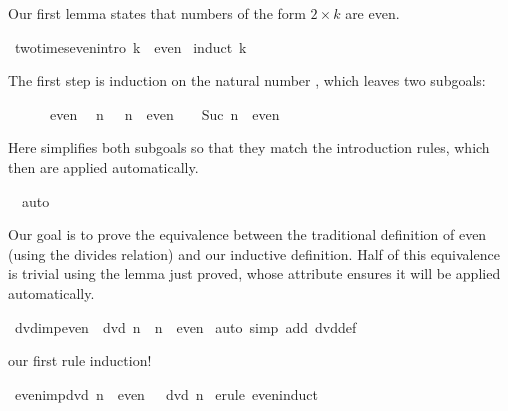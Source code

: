 \begin{isabellebody}
\begin{isamarkuptext}
Our first lemma states that numbers of the form $2\times k$ are even.%
\end{isamarkuptext}%
\ two{\isacharunderscore}times{\isacharunderscore}even{\isacharbrackleft}intro{\isacharbang}{\isacharbrackright}{\isacharcolon}\ {\isachardoublequote}{\isacharhash}{}{\isacharasterisk}k\ {\isasymin}\ even{\isachardoublequote}\isanewline
{}\ {\isacharparenleft}induct\ {\isachardoublequote}k{\isachardoublequote}{\isacharparenright}%
\begin{isamarkuptxt}%
The first step is induction on the natural number , which leaves
two subgoals:
\begin{isabelle}%
\ {}{\isachardot}\ {\isacharhash}{}\ {\isacharasterisk}\ {}\ {\isasymin}\ even\isanewline
\ {}{\isachardot}\ {\isasymAnd}n{\isachardot}\ {\isacharhash}{}\ {\isacharasterisk}\ n\ {\isasymin}\ even\ {\isasymLongrightarrow}\ {\isacharhash}{}\ {\isacharasterisk}\ Suc\ n\ {\isasymin}\ even%
\end{isabelle}
Here  simplifies both subgoals so that they match the introduction
rules, which then are applied automatically.%
\end{isamarkuptxt}%
\ \ auto\isanewline
{}%
\begin{isamarkuptext}%
Our goal is to prove the equivalence between the traditional definition
of even (using the divides relation) and our inductive definition.  Half of
this equivalence is trivial using the lemma just proved, whose 
attribute ensures it will be applied automatically.%
\end{isamarkuptext}%
\ dvd{\isacharunderscore}imp{\isacharunderscore}even{\isacharcolon}\ {\isachardoublequote}{\isacharhash}{}\ dvd\ n\ {\isasymLongrightarrow}\ n\ {\isasymin}\ even{\isachardoublequote}\isanewline
{}\ {\isacharparenleft}auto\ simp\ add{\isacharcolon}\ dvd{\isacharunderscore}def{\isacharparenright}%
\begin{isamarkuptext}%
our first rule induction!%
\end{isamarkuptext}%
\ even{\isacharunderscore}imp{\isacharunderscore}dvd{\isacharcolon}\ {\isachardoublequote}n\ {\isasymin}\ even\ {\isasymLongrightarrow}\ {\isacharhash}{}\ dvd\ n{\isachardoublequote}\isanewline
{}\ {\isacharparenleft}erule\ even{\isachardot}induct{\isacharparenright}%
\begin{isamarkuptxt}%

\end{isamarkuptxt}
\end{isabellebody}
